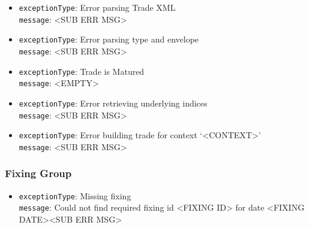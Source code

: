 \begin{itemize}
  \item \lstinline!exceptionType!: Error parsing Trade XML \\
        \lstinline!message!: <SUB ERR MSG>

  \item \lstinline!exceptionType!: Error parsing type and envelope \\
        \lstinline!message!: <SUB ERR MSG>

  \item \lstinline!exceptionType!: Trade is Matured \\
        \lstinline!message!: <EMPTY>
  
  \item \lstinline!exceptionType!: Error retrieving underlying indices \\
        \lstinline!message!: <SUB ERR MSG>

  \item \lstinline!exceptionType!: Error building trade for context `<CONTEXT>' \\
        \lstinline!message!: <SUB ERR MSG>

  \ifdefined\UserGuide
  \else
    
  \fi

\end{itemize}

\subsubsection*{Fixing Group}

\begin{itemize}

  \item \lstinline!exceptionType!: Missing fixing \\
        \lstinline!message!: Could not find required fixing id <FIXING ID> for date <FIXING DATE><SUB ERR MSG>

  \ifdefined\UserGuide
  \else
    
  \fi


\end{itemize}
